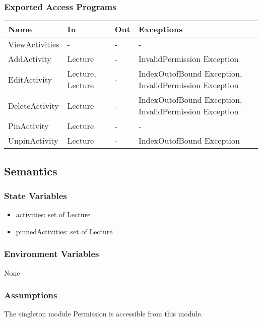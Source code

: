 \documentclass[12pt, titlepage]{article}
\begin{document}
\subsubsection{Exported Access Programs}
\begin{center}
\begin{tabular}{p{4cm} p{2cm} p{4cm} p{4cm}}
\hline
\textbf{Name} & \textbf{In} & \textbf{Out} & \textbf{Exceptions} \\
\hline
ViewActivities & - & - & - \\
AddActivity & Lecture & - & InvalidPermission Exception \\
EditActivity & Lecture, Lecture & - & IndexOutofBound Exception, InvalidPermission Exception \\
DeleteActivity & Lecture & - & IndexOutofBound Exception, InvalidPermission Exception \\
PinActivity & Lecture & - & - \\
UnpinActivity & Lecture & - & IndexOutofBound Exception \\
\hline
\end{tabular}
\end{center}

\subsection{Semantics}

\subsubsection{State Variables}

\begin{itemize}
  \item activities: set of Lecture
  \item pinnedActivities: set of Lecture
\end{itemize}

\subsubsection{Environment Variables}

None

\subsubsection{Assumptions}

The singleton module Permission is accessible from this module.
\end{document}
